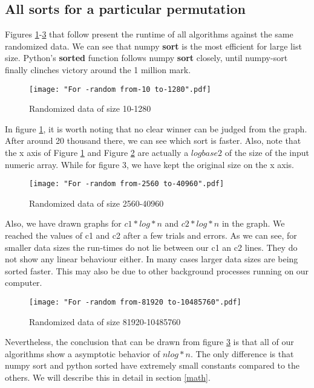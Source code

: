 \documentclass[sigconf,  natbib, screen]{acmart}
\begin{document}
\subsection{All sorts for a particular permutation }\label{allsorts}

Figures \ref{fig:random1}-\ref{fig:random3} that follow present the runtime of all algorithms against the same randomized data.
We can see that numpy \textbf{sort} is the most efficient for large list size. Python's \textbf{sorted} function follows  numpy \textbf{sort} closely, until numpy-sort finally clinches victory around the 1 million mark.


\begin{figure}[ht]
\texttt{[image: "For -random from-10 to-1280".pdf]}
    \caption{Randomized data of size 10-1280 }
    \label{fig:random1}
\end{figure}

In figure \ref{fig:random1}, it is worth noting that no clear winner can be judged from the graph. After around 20 thousand there, we can see which sort is faster. Also, note that the x axis of Figure \ref{fig:random1}  and Figure  \ref{fig:random2} are actually a $log base 2$ of the size of the input numeric array. While for figure 3, we have kept the original size on the x axis.

\begin{figure}[ht]
\texttt{[image: "For -random from-2560 to-40960".pdf]}
    \caption{Randomized data of size 2560-40960}
    \label{fig:random2}
\end{figure}

Also, we have drawn graphs for $c1*log*n$ and $c2*log*n$  in the graph. We reached the values of c1 and c2 after a few trials and errors. As we can see, for smaller data sizes the run-times do not lie between our c1 an c2 lines. They do not show any linear behaviour either. In many cases larger data sizes are being sorted faster. This may also be due to other background processes running on our computer. 

\begin{figure}[ht]
\texttt{[image: "For -random from-81920 to-10485760".pdf]}
    \caption{Randomized data of size 81920-10485760 }
    \label{fig:random3}
\end{figure}

Nevertheless, the conclusion that can be drawn from figure \ref{fig:random3} is that all of our algorithms show a asymptotic behavior of $nlog*n$. The only difference is that numpy sort and python sorted have extremely small constants compared to the others. We will describe this in detail in section \ref{math}.
\end{document}
